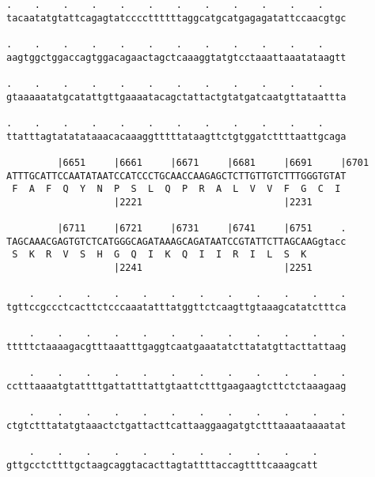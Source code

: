 \documentclass{article}
\begin{document}
\begin{Verbatim}
.    .    .    .    .    .    .    .    .    .    .    .    
tacaatatgtattcagagtatccccttttttaggcatgcatgagagatattccaacgtgc
                                                            
.    .    .    .    .    .    .    .    .    .    .    .    
aagtggctggaccagtggacagaactagctcaaaggtatgtcctaaattaaatataagtt
                                                            
.    .    .    .    .    .    .    .    .    .    .    .    
gtaaaaatatgcatattgttgaaaatacagctattactgtatgatcaatgttataattta
                                                            
.    .    .    .    .    .    .    .    .    .    .    .    
ttatttagtatatataaacacaaaggtttttataagttctgtggatcttttaattgcaga
                                                            
         |6651     |6661     |6671     |6681     |6691     |6701
ATTTGCATTCCAATATAATCCATCCCTGCAACCAAGAGCTCTTGTTGTCTTTGGGTGTAT
 F  A  F  Q  Y  N  P  S  L  Q  P  R  A  L  V  V  F  G  C  I 
                   |2221                         |2231      
  
         |6711     |6721     |6731     |6741     |6751     .
TAGCAAACGAGTGTCTCATGGGCAGATAAAGCAGATAATCCGTATTCTTAGCAAGgtacc
 S  K  R  V  S  H  G  Q  I  K  Q  I  I  R  I  L  S  K       
                   |2241                         |2251      
  
    .    .    .    .    .    .    .    .    .    .    .    .
tgttccgccctcacttctcccaaatatttatggttctcaagttgtaaagcatatctttca
                                                            
    .    .    .    .    .    .    .    .    .    .    .    .
tttttctaaaagacgtttaaatttgaggtcaatgaaatatcttatatgttacttattaag
                                                            
    .    .    .    .    .    .    .    .    .    .    .    .
cctttaaaatgtattttgattatttattgtaattctttgaagaagtcttctctaaagaag
                                                            
    .    .    .    .    .    .    .    .    .    .    .    .
ctgtctttatatgtaaactctgattacttcattaaggaagatgtctttaaaataaaatat
                                                            
    .    .    .    .    .    .    .    .    .    .    .
gttgcctcttttgctaagcaggtacacttagtattttaccagttttcaaagcatt
                                                       
                                                       
 

\end{Verbatim}
\end{document}

